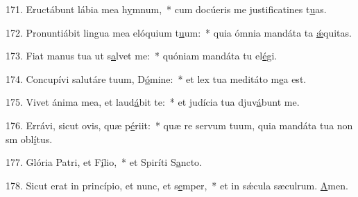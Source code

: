 171. Eructábunt lábia mea h\uline{y}mnum,~* cum docúeris me justificatines t\uline{u}as.\par 
172. Pronuntiábit lingua mea elóquium t\uline{u}um:~* quia ómnia mandáta ta \uline{ǽ}quitas.\par 
173. Fiat manus tua ut s\uline{a}lvet me:~* quóniam mandáta tu el\uline{é}gi.\par 
174. Concupívi salutáre tuum, D\uline{ó}mine:~* et lex tua meditáto m\uline{e}a est.\par 
175. Vivet ánima mea, et laud\uline{á}bit te:~* et judícia tua djuv\uline{á}bunt me.\par 
176. Errávi, sicut ovis, quæ p\uline{é}riit:~* quæ re servum tuum, quia mandáta tua non sm obl\uline{í}tus.\par 
177. Glória Patri, et F\uline{í}lio,~* et Spiríti S\uline{a}ncto.\par 
178. Sicut erat in princípio, et nunc, et s\uline{e}mper,~* et in sǽcula sæculrum. \uline{A}men.\par 
